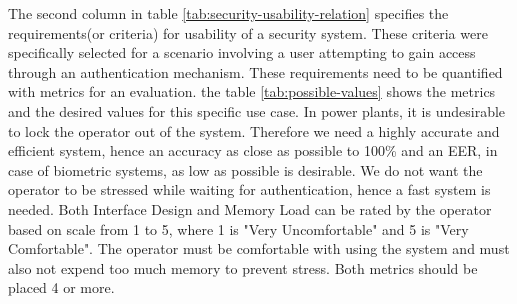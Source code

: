 \begin{center}
\begin{table}
\caption{Relation between security and usability}
\label{tab:security-usability-relation}
\end{table}
\end{center}


The second column in table \ref{tab:security-usability-relation} specifies the requirements(or criteria) for usability of a security system. These criteria were specifically selected for a scenario involving a user attempting to gain access through an authentication mechanism. These requirements need to be quantified with metrics for an evaluation. the table \ref{tab:possible-values} shows the metrics and the desired values for this specific use case. In power plants, it is undesirable to lock the operator out of the system. Therefore we need a highly accurate and efficient system, hence an accuracy as close as possible to 100\% and an EER, in case of biometric systems, as low as possible is desirable. We do not want the operator to be stressed while waiting for authentication, hence a fast system is needed. Both Interface Design and Memory Load can be rated by the operator based on scale from 1 to 5, where 1 is "Very Uncomfortable" and 5 is "Very Comfortable". The operator must be comfortable with using the system and must also not expend too much memory to prevent stress. Both metrics should be placed 4 or more.

